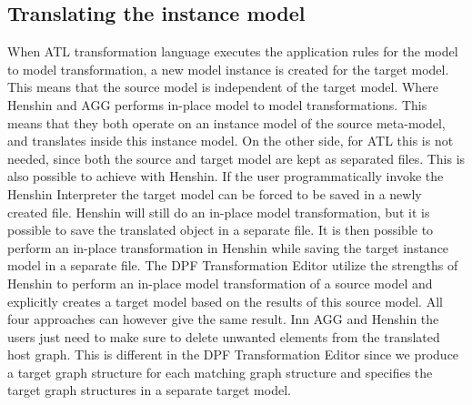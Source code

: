 \subsection{Translating the instance model}

When ATL transformation language executes the application rules for the model to
model transformation, a new model instance is created for the target model. This
means that the source model is independent of the target model. Where Henshin
and AGG performs in-place model to model transformations. This means that they
both operate on an instance model of the source meta-model, and translates
inside this instance model. On the other side, for ATL this is not needed, since
both the source and target model are kept as separated files. This is also
possible to achieve with Henshin. If the user programmatically invoke the
Henshin Interpreter the target model can be forced to be saved in a newly
created file. Henshin will still do an in-place model transformation, but it is
possible to save the translated object in a separate file. It is then possible
to perform an in-place transformation in Henshin while saving the target
instance model in a separate file. The DPF Transformation Editor utilize the
strengths of Henshin to perform an in-place model transformation of a source
model and explicitly creates a target model based on the results of this source
model. All four approaches can however give the same result. Inn AGG and Henshin
the users just need to make sure to delete unwanted elements from the
translated host graph. This is different in the DPF Transformation Editor
since we produce a target graph structure for each matching graph structure and
specifies the target graph structures in a separate target model. 

